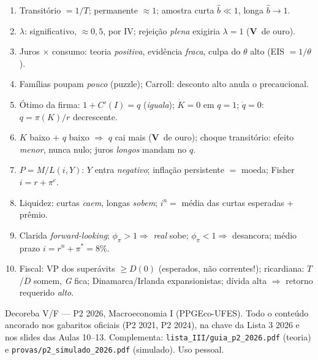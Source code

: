 \documentclass[12pt, a4paper]{article}
\newcommand{\Vok}{\textbf{\textcolor{greenbox}{V}}}
\begin{document}
\begin{provabox}[title={Se só der para lembrar de 10 coisas}]
\begin{enumerate}[leftmargin=1.6em, itemsep=0.2em]
\item Transitório $= 1/T$; permanente $\approx 1$; amostra curta $\hat b \ll
1$, longa $\hat b \to 1$.
\item $\lambda$: significativo, $\approx 0{,}5$, por IV; rejeição
\emph{plena} exigiria $\lambda = 1$ (\Vok\ de ouro).
\item Juros $\times$ consumo: teoria \emph{positiva}, evidência \emph{fraca},
culpa do $\theta$ alto (EIS $= 1/\theta$).
\item Famílias poupam \emph{pouco} (puzzle); Carroll: desconto alto anula o
precaucional.
\item Ótimo da firma: $1 + C'(I) = q$ (\emph{iguala}); $\dot K = 0$ em
$q = 1$; $\dot q = 0$: $q = \pi(K)/r$ decrescente.
\item $K$ baixo $+$ $q$ baixo $\Rightarrow$ $q$ cai mais (\Vok\ de ouro);
choque transitório: efeito \emph{menor}, nunca nulo; juros \emph{longos}
mandam no $q$.
\item $P = M/L(i,Y)$: $Y$ entra \emph{negativo}; inflação persistente $=$
moeda; Fisher $i = r + \pi^e$.
\item Liquidez: curtas \emph{caem}, longas \emph{sobem}; $i^n =$ média das
curtas esperadas $+$ prêmio.
\item Clarida \emph{forward-looking}; $\phi_\pi > 1 \Rightarrow$ \emph{real}
sobe; $\phi_\pi < 1 \Rightarrow$ desancora; médio prazo $i = r^n + \pi^* =
8\%$.
\item Fiscal: VP dos superávits $\geq D(0)$ (esperados, não correntes!);
ricardiana: $T$/$D$ somem, \emph{G} fica; Dinamarca/Irlanda expansionistas;
dívida alta $\Rightarrow$ retorno requerido \emph{alto}.
\end{enumerate}
\end{provabox}

\vfill
{\small\color{grayrbc} Decoreba V/F --- P2 2026, Macroeconomia I (PPGEco-UFES).
Todo o conteúdo ancorado nos gabaritos oficiais (P2 2021, P2 2024), na chave
da Lista 3 2026 e nos slides das Aulas 10--13. Complementa:
\texttt{lista\_III/guia\_p2\_2026.pdf} (teoria) e
\texttt{provas/p2\_simulado\_2026.pdf} (simulado). Uso pessoal.}
\end{document}
